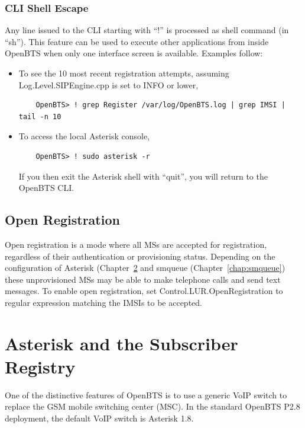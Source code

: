 \documentclass[11pt,openany]{book}
\begin{document}
\subsection{CLI Shell Escape}
Any line issued to the CLI starting with ``!'' is processed as shell command (in ``sh'').  This feature can be used to execute other applications from inside OpenBTS when only one interface screen is available. Examples follow:
\begin{itemize}
	\item To see the 10 most recent registration attempts, assuming Log.Level.SIPEngine.cpp is set to INFO or lower,
	\begin{verbatim}
	OpenBTS> ! grep Register /var/log/OpenBTS.log | grep IMSI | tail -n 10
	\end{verbatim}
	\item To access the local Asterisk console,
	\begin{verbatim}
	OpenBTS> ! sudo asterisk -r
	\end{verbatim}
	If you then exit the Asterisk shell with ``quit'', you will return to the OpenBTS CLI.
\end{itemize}




\section{Open Registration}
\label{sec:openRegistration}
Open registration is a mode where all MSs are accepted for registration, regardless of their authentication or provisioning status.  Depending on the configuration of Asterisk (Chapter~\ref{chap:asterisk} and smqueue (Chapter~\ref{chap:smqueue}) these unprovisioned MSs may be able to make telephone calls and send text messages.  To enable open registration, set Control.LUR.OpenRegistration to regular expression matching the IMSIs to be accepted.









\chapter{Asterisk and the Subscriber Registry}
\label{chap:asterisk}
One of the distinctive features of OpenBTS is to use a generic VoIP switch to replace the GSM mobile switching center (MSC).
In the standard OpenBTS P2.8 deployment, the default VoIP switch is Asterisk 1.8.
\end{document}
